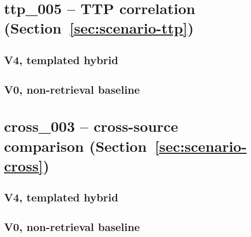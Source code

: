 \section*{ttp\_005 -- TTP correlation (Section~\ref{sec:scenario-ttp})}

\subsection*{V4, templated hybrid}


\subsection*{V0, non-retrieval baseline}


\section*{cross\_003 -- cross-source comparison (Section~\ref{sec:scenario-cross})}

\subsection*{V4, templated hybrid}


\subsection*{V0, non-retrieval baseline}

